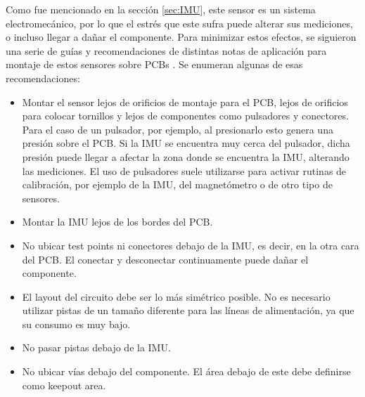 

Como fue mencionado en la sección \ref{sec:IMU}, este sensor es un sistema electromecánico, por lo que el estrés que este sufra puede alterar sus mediciones, o incluso llegar a dañar el componente. Para minimizar estos efectos, se siguieron una serie de guías y recomendaciones de distintas notas de aplicación para montaje de estos sensores sobre PCBs \cite{IMUpcb_1} \cite{IMUpcb_2} \cite{IMUpcb_3}. Se enumeran algunas de esas recomendaciones:


\begin{itemize}
    \item Montar el sensor lejos de orificios de montaje para el PCB, lejos de orificios para colocar tornillos y lejos de componentes como pulsadores y conectores. Para el caso de un pulsador, por ejemplo, al presionarlo esto genera una presión sobre el PCB. Si la IMU se encuentra muy cerca del pulsador, dicha presión puede llegar a afectar la zona donde se encuentra la IMU, alterando las mediciones. El uso de pulsadores suele utilizarse para activar rutinas de calibración, por ejemplo de la IMU, del magnetómetro o de otro tipo de sensores. %
    \item Montar la IMU lejos de los bordes del PCB.
    \item No ubicar test points ni conectores debajo de la IMU, es decir, en la otra cara del PCB. El conectar y desconectar continuamente puede dañar el componente.
    \item El layout del circuito debe ser lo más simétrico posible. No es necesario utilizar pistas de un tamaño diferente para las líneas de alimentación, ya que su consumo es muy bajo.
    \item No pasar pistas debajo de la IMU.
    \item No ubicar vías debajo del componente. El área debajo de este debe definirse como keepout area.
\end{itemize}

